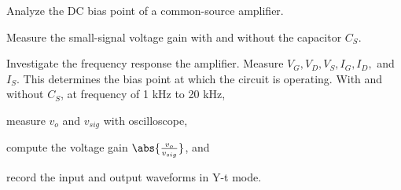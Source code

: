 \documentclass[a4paper,12pt]{article}
\begin{document}
\temdoc
{}
\bit
\item Analyze the DC bias point of a common-source amplifier.
\item Measure the small-signal voltage gain with and without the capacitor \(C_S\).
\item Investigate the frequency response the amplifier.
\eit
{}
Measure $V_G,V_D,V_S,I_G,I_D,$ and $I_S$. This determines the bias point at which the circuit is operating.
With and without $C_S$, at frequency of 1 kHz to 20 kHz,
\bit
\item measure $v_o$ and $v_{sig}$ with oscilloscope,
\item compute the voltage gain $\abs{\frac{v_o}{v_{sig}}}$, and
\item record the input and output waveforms in Y-t mode.
\eit
\end{document}
